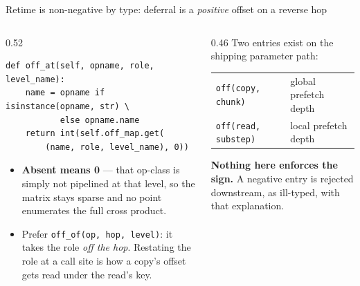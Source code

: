 \documentclass[aspectratio=169,9pt]{beamer}
\newcommand{\key}[1]{\textcolor{acc}{\textbf{#1}}}
\newcommand{\bad}[1]{\textcolor{warn}{\textbf{#1}}}
\newcommand{\good}[1]{\textcolor{ok}{\textbf{#1}}}
\begin{document}
\begin{frame}[fragile]{Retime is non-negative by type: deferral is a \emph{positive} offset on a reverse hop}
\begin{center}
\end{center}
\vspace{-4pt}
\begin{columns}[T]
\begin{column}{0.52\textwidth}
\begin{lstlisting}[style=py]
def off_at(self, opname, role, level_name):
    name = opname if isinstance(opname, str) \
           else opname.name
    return int(self.off_map.get(
        (name, role, level_name), 0))
\end{lstlisting}
\begin{itemize}\itemsep1pt
\item \key{Absent means 0} --- that op-class is simply not pipelined at that level, so the
      matrix stays sparse and no point enumerates the full cross product.
\item Prefer \texttt{off\_of(op, hop, level)}: it takes the role \emph{off the hop}. Restating
      the role at a call site is how a copy's offset gets read under the read's key.
\end{itemize}
\end{column}
\begin{column}{0.46\textwidth}
Two entries exist on the shipping parameter path:
\begin{center}\scriptsize
\begin{tabular}{ll}
\toprule
\texttt{off(copy, chunk)} & global prefetch depth \\
\texttt{off(read, substep)} & local prefetch depth \\
\bottomrule
\end{tabular}
\end{center}
\vspace{3pt}
\vspace{2pt}

\bad{Nothing here enforces the sign.} A negative entry is rejected downstream, as ill-typed,
with that explanation.
\end{column}
\end{columns}
\end{frame}
\end{document}
